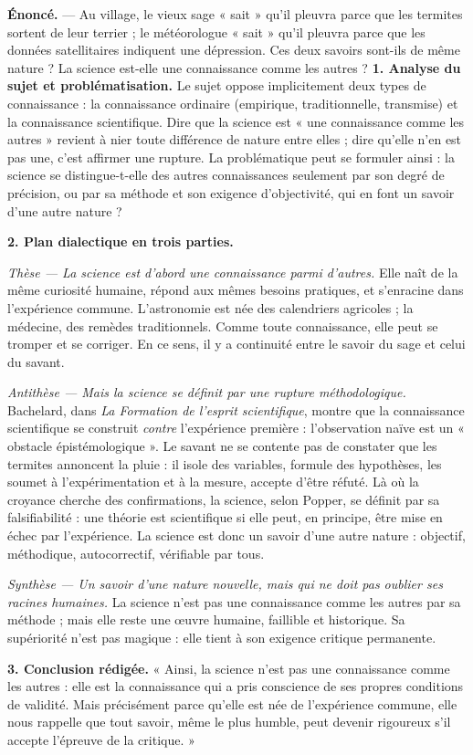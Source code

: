 \documentclass[11pt]{article}
\newcommand{\cle}[1]{{\popxbold\color{popdark}#1}}
\begin{document}
\begin{exoresolu}
\textbf{Énoncé.} — Au village, le vieux sage « sait » qu'il pleuvra parce que les termites sortent de leur terrier ; le météorologue « sait » qu'il pleuvra parce que les données satellitaires indiquent une dépression. Ces deux savoirs sont-ils de même nature ? La science est-elle une connaissance comme les autres ?
\tcblower
\textbf{1. Analyse du sujet et problématisation.} Le sujet oppose implicitement deux types de connaissance : la connaissance ordinaire (empirique, traditionnelle, transmise) et la connaissance scientifique. Dire que la science est « une connaissance comme les autres » revient à nier toute différence de nature entre elles ; dire qu'elle n'en est pas une, c'est affirmer une rupture. La \cle{problématique} peut se formuler ainsi : la science se distingue-t-elle des autres connaissances seulement par son degré de précision, ou par sa méthode et son exigence d'objectivité, qui en font un savoir d'une autre nature ?

\textbf{2. Plan dialectique en trois parties.}

\emph{Thèse — La science est d'abord une connaissance parmi d'autres.} Elle naît de la même curiosité humaine, répond aux mêmes besoins pratiques, et s'enracine dans l'expérience commune. L'astronomie est née des calendriers agricoles ; la médecine, des remèdes traditionnels. Comme toute connaissance, elle peut se tromper et se corriger. En ce sens, il y a continuité entre le savoir du sage et celui du savant.

\emph{Antithèse — Mais la science se définit par une rupture méthodologique.} Bachelard, dans \emph{La Formation de l'esprit scientifique}, montre que la connaissance scientifique se construit \emph{contre} l'expérience première : l'observation naïve est un « obstacle épistémologique ». Le savant ne se contente pas de constater que les termites annoncent la pluie : il isole des variables, formule des hypothèses, les soumet à l'expérimentation et à la mesure, accepte d'être réfuté. Là où la croyance cherche des confirmations, la science, selon Popper, se définit par sa \cle{falsifiabilité} : une théorie est scientifique si elle peut, en principe, être mise en échec par l'expérience. La science est donc un savoir d'une autre nature : objectif, méthodique, autocorrectif, vérifiable par tous.

\emph{Synthèse — Un savoir d'une nature nouvelle, mais qui ne doit pas oublier ses racines humaines.} La science n'est pas une connaissance comme les autres par sa méthode ; mais elle reste une œuvre humaine, faillible et historique. Sa supériorité n'est pas magique : elle tient à son exigence critique permanente.

\textbf{3. Conclusion rédigée.} « Ainsi, la science n'est pas une connaissance comme les autres : elle est la connaissance qui a pris conscience de ses propres conditions de validité. Mais précisément parce qu'elle est née de l'expérience commune, elle nous rappelle que tout savoir, même le plus humble, peut devenir rigoureux s'il accepte l'épreuve de la critique. »
\end{exoresolu}
\end{document}
